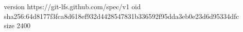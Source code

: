 version https://git-lfs.github.com/spec/v1
oid sha256:64d8177f3fca8d618ef932d4428547831b336592f95dda3eb0e23d6d95334dfc
size 2400
